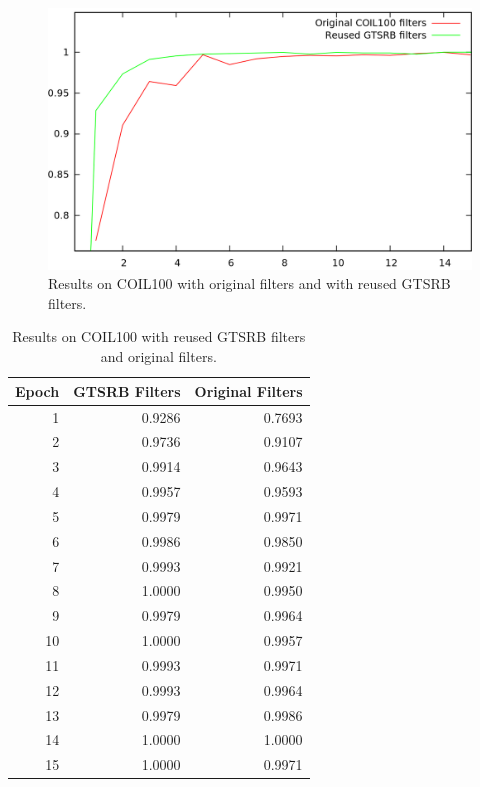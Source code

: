 \documentclass[11pt, a4paper]{article}
\begin{document}
\begin{figure}[h!]
	\centering
	\includegraphics[width=1\textwidth]{coil100_results.png}
	\caption{Results on COIL100 with original filters and with reused GTSRB filters.}
	\label{fig:coil100_results}
\end{figure}
\begin{table}[h!]
	\centering
	\begin{tabular}{|r|rr|}
		\hline
		Epoch & GTSRB Filters & Original Filters\\ \hline
		1 & 0.9286 & 0.7693\\
		2 & 0.9736 & 0.9107\\
		3 & 0.9914 & 0.9643\\
		4 & 0.9957 & 0.9593\\
		5 & 0.9979 & 0.9971\\
		6 & 0.9986 & 0.9850\\
		7 & 0.9993 & 0.9921\\
		8 & 1.0000 & 0.9950\\
		9 & 0.9979 & 0.9964\\
		10 & 1.0000 & 0.9957\\
		11 & 0.9993 & 0.9971\\
		12 & 0.9993 & 0.9964\\
		13 & 0.9979 & 0.9986\\
		14 & 1.0000 & 1.0000\\
		15 & 1.0000 & 0.9971\\ \hline
	\end{tabular}

	\caption{Results on COIL100 with reused GTSRB filters and original filters.}
	\label{tab:coil-results}
\end{table}
\end{document}
